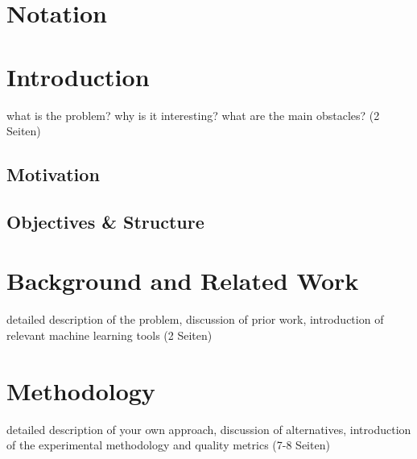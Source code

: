 \documentclass[
     12pt,         %
     a4paper,      %
     DIV=14,        %
     ]{scrreprt}
\begin{document}
\chapter*{Notation}


\newpage

\tableofcontents
\cleardoublepage
{} 



\chapter{Introduction}
\label{chap:intro}
what is the problem? why is it interesting? what are the main obstacles? (2 Seiten)

\section{Motivation}


\section{Objectives \& Structure}


\newpage


\chapter{Background and Related Work}
\label{chap:background}

detailed description of the problem, discussion of prior work, introduction of relevant machine learning tools (2 Seiten)

\chapter{Methodology}
\label{chap:methodology}

detailed description of your own approach, discussion of alternatives, introduction of the experimental methodology and quality metrics (7-8 Seiten)
\end{document}
